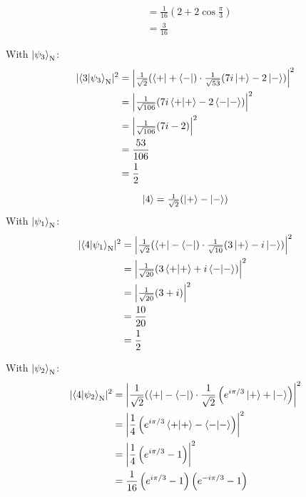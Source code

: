 \documentclass[11pt]{article}
\newcommand\abs[1]{\lvert#1\rvert}
\newcommand\Abs[1]{\left\lvert#1\right\rvert}
\begin{document}
\begin{enumerate}[label=\textbf{\arabic*.}, start=2]
{\begin{enumerate}[label=\textbf{(\alph*)}]
{\begin{align*}
                        &=\frac{1}{16}\left(2+2\cos\tfrac{\pi}{3}\right) \\
                        &=\frac{3}{16}
                    \end{align*}
                    \par
                    With \(\ket{\psi_3}_\mathrm{N}\):
                    \begin{align*}
                        \abs{\braket{3|\psi_3}_\mathrm{N}}^2&=\Abs{\tfrac{1}{\sqrt 2}(\bra{+}+\bra{-})\cdot\tfrac{1}{\sqrt{53}}(7i\ket{+}-2\ket{-})}^2 \\
                        &=\Abs{\tfrac{1}{\sqrt{106}}(7i\braket{+|+}-2\braket{-|-})}^2 \\
                        &=\Abs{\tfrac{1}{\sqrt{106}}(7i-2)}^2 \\
                        &=\frac{53}{106} \\
                        &=\frac 1 2
                    \end{align*}
                    \par
                    {\boldmath \[\ket{4}=\tfrac{1}{\sqrt 2}(\ket{+}-\ket{-})\]}
                    With \(\ket{\psi_1}_\mathrm{N}\):
                    \begin{align*}
                        \abs{\braket{4|\psi_1}_\mathrm{N}}^2&=\Abs{\tfrac{1}{\sqrt 2}(\bra{+}-\bra{-})\cdot\tfrac{1}{\sqrt{10}}(3\ket{+}-i\ket{-})}^2 \\
                        &=\Abs{\tfrac{1}{\sqrt{20}}(3\braket{+|+}+i\braket{-|-})}^2 \\
                        &=\Abs{\tfrac{1}{\sqrt{20}}(3+i)}^2 \\
                        &=\frac{10}{20} \\
                        &=\frac 1 2
                    \end{align*}
                    \par
                    With \(\ket{\psi_2}_\mathrm{N}\):
                    \begin{align*}
                        \abs{\braket{4|\psi_2}_\mathrm{N}}^2&=\Abs{\frac{1}{\sqrt 2}(\bra{+}-\bra{-})\cdot\frac{1}{\sqrt 2}\left(e^{i\pi/3}\ket{+}+\ket{-}\right)}^2 \\
                        &=\Abs{\frac 1 4 \left(e^{i\pi/3}\braket{+|+}-\braket{-|-}\right)}^2 \\
                        &=\Abs{\frac 1 4 \left(e^{i\pi/3}-1\right)}^2 \\
                        &=\frac{1}{16}\left(e^{i\pi/3}-1\right)\left(e^{-i\pi/3}-1\right) \\

\end{align*}}
\end{enumerate}}
\end{enumerate}
\end{document}
